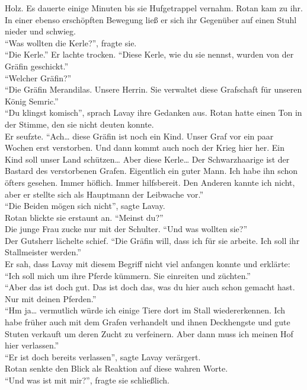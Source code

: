 Holz. Es dauerte einige Minuten bis sie Hufgetrappel vernahm. Rotan kam zu ihr. In 
einer ebenso erschöpften Bewegung ließ er sich ihr Gegenüber auf einen Stuhl nieder und schwieg. \\
``Was wollten die Kerle?'', fragte sie.\\
``Die Kerle.'' Er lachte trocken. ``Diese Kerle, wie du sie nennst, wurden von der Gräfin 
geschickt.''\\
``Welcher Gräfin?''\\
``Die Gräfin Merandilas. Unsere Herrin. Sie verwaltet diese Grafschaft für unseren König Semric.''\\
``Du klingst komisch'', sprach Lavay ihre Gedanken aus. Rotan hatte einen Ton in der Stimme, den 
sie nicht deuten konnte.\\
Er seufzte. ``Ach… diese Gräfin ist noch ein Kind. Unser Graf vor ein paar Wochen erst verstorben. 
Und dann kommt auch noch der Krieg hier her. Ein Kind soll unser Land schützen… Aber diese Kerle… 
Der Schwarzhaarige ist der Bastard des verstorbenen Grafen. Eigentlich ein guter Mann. Ich habe ihn 
schon öfters gesehen. Immer höflich. Immer hilfsbereit. Den Anderen kannte ich nicht, aber er 
stellte sich als Hauptmann der Leibwache vor.''\\
``Die Beiden mögen sich nicht'', sagte Lavay.\\
Rotan blickte sie erstaunt an. ``Meinst du?''\\
Die junge Frau zucke nur mit der Schulter. ``Und was wollten sie?''\\
Der Gutsherr lächelte schief. ``Die Gräfin will, dass ich für sie arbeite. Ich soll ihr 
Stallmeister werden.''\\
Er sah, dass Lavay mit diesem Begriff nicht viel anfangen konnte und erklärte: ``Ich soll mich um 
ihre Pferde kümmern. Sie einreiten und züchten.''\\
``Aber das ist doch gut. Das ist doch das, was du hier auch schon gemacht hast. Nur mit deinen 
Pferden.''\\
``Hm ja… vermutlich würde ich einige Tiere dort im Stall wiedererkennen. Ich habe früher auch mit 
dem Grafen verhandelt und ihnen Deckhengste und gute Stuten verkauft um deren Zucht zu verfeinern. 
Aber dann muss ich meinen Hof hier verlassen.''\\
``Er ist doch bereits verlassen'', sagte Lavay verärgert.\\
Rotan senkte den Blick als Reaktion auf diese wahren Worte.\\
``Und was ist mit mir?'', fragte sie schließlich.\\
